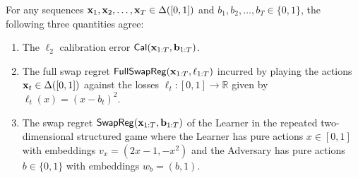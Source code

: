 \begin{lemma}\label{lem:calib_swap_regret} For any sequences $\mathbf{x}_1, \mathbf{x}_2, \dots, \mathbf{x}_T \in \Delta([0, 1])$ and $b_1, b_2, \dots, b_T \in \{0, 1\}$, the following three quantities agree:

\begin{enumerate}
    \item The $\ell_2$ calibration error $\operatorname{\mathsf{Cal}}(\mathbf{x}_{1:T}, \mathbf{b}_{1:T})$.
    \item The full swap regret $\mathsf{FullSwapReg}(\mathbf{x}_{1:T}, \ell_{1:T})$ incurred by playing the actions $\mathbf{x}_t \in \Delta([0, 1])$ against the losses $\ell_t: [0, 1] \rightarrow \mathbb{R}$ given by $\ell_t(x) = (x - b_t)^2$.
    \item The swap regret $\operatorname{\mathsf{SwapReg}}(\mathbf{x}_{1:T}, \mathbf{b}_{1:T})$ of the Learner in the repeated two-dimensional structured game where the Learner has pure actions $x \in [0, 1]$ with embeddings $v_x = (2x-1, -x^2)$ and the Adversary has pure actions $b \in \{0, 1\}$ with embeddings $w_{b} = (b, 1)$.
\end{enumerate}
\end{lemma}
